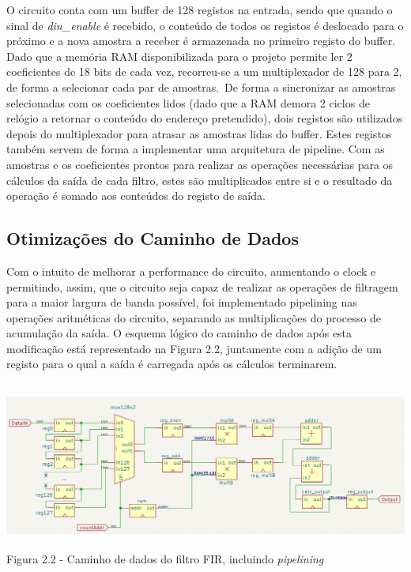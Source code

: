 \documentclass[10pt,twoside]{article}
\begin{document}
O circuito conta com um buffer de 128 registos na entrada, sendo que quando o sinal de \textit{din\_enable} é recebido, o conteúdo de todos os registos é deslocado para o próximo e a nova amostra a receber é armazenada no primeiro registo do buffer. Dado que a memória RAM disponibilizada para o projeto permite ler 2 coeficientes de 18 bits de cada vez, recorreu-se a um multiplexador de 128 para 2, de forma a selecionar cada par de amostras.\
De forma a sincronizar as amostras selecionadas com os coeficientes lidos (dado que a RAM demora 2 ciclos de relógio a retornar o conteúdo do endereço pretendido), dois registos são utilizados depois do multiplexador para atrasar as amostras lidas do buffer. Estes registos também servem de forma a implementar uma arquitetura de pipeline. Com as amostras e os coeficientes prontos para realizar as operações necessárias para os cálculos da saída de cada filtro, estes são multiplicados entre si e o resultado da operação é somado aos conteúdos do registo de saída.

\subsection{Otimizações do Caminho de Dados}
Com o intuito de melhorar a performance do circuito, aumentando o clock e permitindo, assim, que o circuito seja capaz de realizar as operações de filtragem para a maior largura de banda possível, foi implementado pipelining nas operações aritméticas do circuito, separando as multiplicações do processo de acumulação da saída. O esquema lógico do caminho de dados após esta modificação está representado na Figura 2.2, juntamente com a adição de um registo para o qual a saída é carregada após os cálculos terminarem.

\begin{center}
	\includegraphics[height=5.5cm]{figures/complete.png}\\
	Figura 2.2 - Caminho de dados do filtro FIR, incluindo \textit{pipelining}
\end{center}
\end{document}
